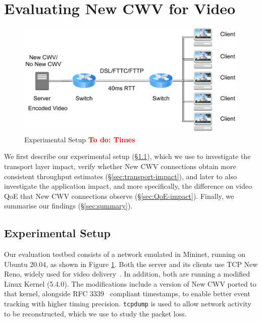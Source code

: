\documentclass[10pt,sigconf,anonymous]{acmart}
\newcommand{\todo}[1]{\textbf{\textcolor{red}{To do: #1}}}
\begin{document}
\section{Evaluating New CWV for Video}
\label{sec:evaluation}

\begin{figure}
  \centering
  \includegraphics[width=.5\textwidth]{figures/setup.pdf}
  \caption{Experimental Setup \todo{Times}}
  \label{fig:experimental-setup}
\end{figure}

We first describe our experimental setup (\S\ref{sec:experimental-setup}), which we use to investigate the transport layer impact, verify whether New CWV connections obtain more consistent throughput estimates (\S\ref{sec:transport-impact}), and later to also investigate the application impact, and more specifically, the difference on video QoE that New CWV connections observe (\S\ref{sec:QoE-impact}). Finally, we summarise our findings (\S\ref{sec:summary}).

\subsection{Experimental Setup}
\label{sec:experimental-setup}

Our evaluation testbed consists of a network emulated in Mininet, running on Ubuntu 20.04, as shown in Figure \ref{fig:experimental-setup}. Both the server and its clients use TCP New Reno, widely used for video delivery~\cite{Mishra-2019-the-great-internet-tcp-congestion-control-census}. In addition, both are running a modified Linux Kernel (5.4.0). The modifications include a version of New CWV ported to that kernel, alongside RFC 3339~\cite{rfc3339-precise-timestamps} compliant timestamps, to enable better event tracking with higher timing precision. \texttt{tcpdump} is used to allow network activity to be reconstructed, which we use to study the packet loss.
\end{document}
